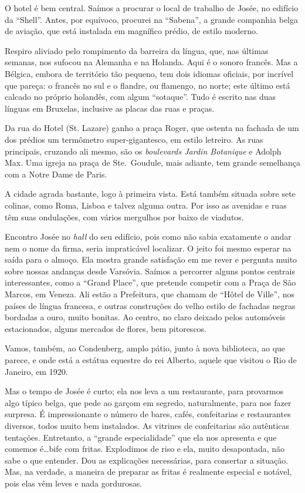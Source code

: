 O hotel é bem central. Saímos a procurar o local de trabalho de Josée, no edifício da ``Shell''. Antes, por equívoco, procurei na ``Sabena'', a grande companhia belga de aviação, que está instalada em magnífico prédio, de estilo moderno.

Respiro aliviado pelo rompimento da barreira da língua, que, nas últimas semanas, nos sufocou na Alemanha e na Holanda. Aqui é o sonoro francês. Mas a Bélgica, embora de território tão pequeno, tem dois idiomas oficiais, por incrível que pareça: o francês no sul e o flandre, ou flamengo, no norte; este último está calcado no próprio holandês, com algum ``sotaque''. Tudo é escrito nas duas línguas em Bruxelas, inclusive as placas das ruas e praças.

Da rua do Hotel (St. Lazare) ganho a praça Roger, que ostenta na fachada de um dos prédios um termômetro super-gigantesco, em estilo letreiro. As ruas principais, cruzando ali mesmo, são os \textit{boulevards Jardin Botanique} e Adolph Max. Uma igreja na praça de Ste.~Goudule, mais adiante, tem grande semelhança com a Notre Dame de Paris.

A cidade agrada bastante, logo à primeira vista. Está também situada sobre sete colinas, como Roma, Lisboa e talvez alguma outra. Por isso as avenidas e ruas têm suas ondulações, com vários mergulhos por baixo de viadutos.

Encontro Josée no \textit{hall} do seu edifício, pois como não sabia exatamente o andar nem o nome da firma, seria impraticável localizar. O jeito foi mesmo esperar na saída para o almoço. Ela mostra grande satisfação em me rever e pergunta muito sobre nossas andanças desde Varsóvia. Saímos a percorrer alguns pontos centrais interessantes, como a ``Grand Place'', que pretende competir com a Praça de São Marcos, em Veneza. Ali estão a Prefeitura, que chamam de ``Hôtel de Ville'', nos países de língua francesa, e outras construções do velho estilo de fachadas negras bordadas a ouro, muito bonitas. Ao centro, no claro deixado pelos automóveis estacionados, alguns mercados de flores, bem pitorescos.

Vamos, também, ao Condenberg, amplo pátio, junto à nova biblioteca, ao que parece, e onde está a estátua equestre do rei Alberto, aquele que visitou o Rio de Janeiro, em 1920.

Mas o tempo de Josée é curto; ela nos leva a um restaurante, para provarmos algo típico belga, que pede ao garçom em segredo, naturalmente, para nos fazer surpresa. É impressionante o número de bares, cafés, confeitarias e restaurantes diversos, todos muito bem instalados. As vitrines de confeitarias são autênticas tentações. Entretanto, a ``grande especialidade'' que ela nos apresenta e que comemos é\ldots bife com fritas. Explodimos de riso e ela, muito desapontada, não sabe o que entender. Dou as explicações necessárias, para consertar a situação. Mas, na verdade, a maneira de preparar as fritas é realmente especial e notável, pois elas vêm leves e nada gordurosas.

